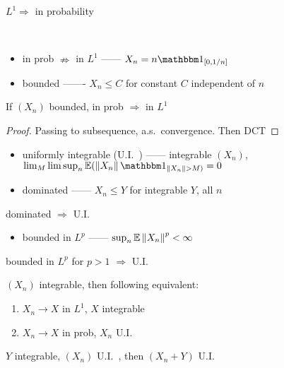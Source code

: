 \begin{prop}
    $L^1 \Rightarrow$ in probability
\end{prop}

\begin{counterexample}\,
    \begin{itemize}
        \item in prob $\nRightarrow$ in $L^1$ ------ $X_n = n\In_{[0,1/n]}$
    \end{itemize}
\end{counterexample}

\begin{itemize}
    \item bounded ------- $X_n \leq C$ for constant $C$ independent of $n$
\end{itemize}

\begin{fact}
    If $(X_n)$ bounded, in prob $\Rightarrow$ in $L^1$
\end{fact}
\begin{proof}
    Passing to subsequence, a.s.\, convergence.
    Then DCT
\end{proof}

\begin{itemize}
    \item uniformly integrable (U.I.\ ) ------ integrable $(X_n)$, $\lim_M \limsup_n \Ex(\norm{X_n} \In_{\norm{X_n} > M)} = 0$
    \item dominated ------ $X_n \leq Y$ for integrable $Y$, all $n$
\end{itemize}

\begin{fact}
    dominated $\Rightarrow$ U.I.\
\end{fact}

\begin{itemize}
    \item bounded in $L^p$ ------ $\sup_n \mathbb{E} \left\lVert X_n\right\rVert^p < \infty$
\end{itemize}

\begin{fact}
    bounded in $L^p$ for $p > 1$ $\Rightarrow$ U.I.\
\end{fact}

\begin{thm}
    $(X_n)$ integrable, then following equivalent:
    \begin{enumerate}
        \item $X_n \rightarrow X$ in $L^1$, $X$ integrable
        \item $X_n \rightarrow X$ in prob, $X_n$ U.I.\
    \end{enumerate}
\end{thm}

\begin{lemma}
    $Y$ integrable, $(X_n)$ U.I.\ , then $(X_n + Y)$ U.I.\
\end{lemma}


